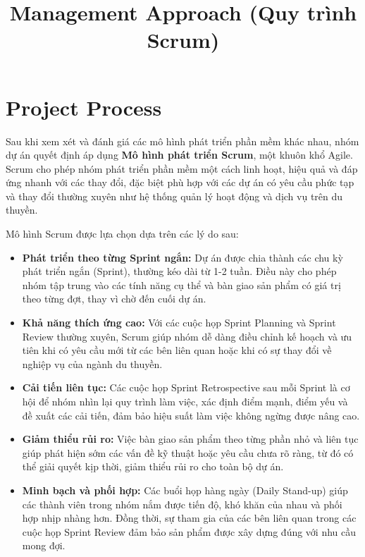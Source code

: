 \documentclass[a4paper,12pt]{article}
\title{\textbf{Management Approach (Quy trình Scrum)}}
\author{}
\date{}
\begin{document}
	
	\maketitle
	
	\section{Project Process}
	
	Sau khi xem xét và đánh giá các mô hình phát triển phần mềm khác nhau, nhóm dự án quyết định áp dụng \textbf{Mô hình phát triển Scrum}, một khuôn khổ Agile. Scrum cho phép nhóm phát triển phần mềm một cách linh hoạt, hiệu quả và đáp ứng nhanh với các thay đổi, đặc biệt phù hợp với các dự án có yêu cầu phức tạp và thay đổi thường xuyên như hệ thống quản lý hoạt động và dịch vụ trên du thuyền.
	
	Mô hình Scrum được lựa chọn dựa trên các lý do sau:
	
	\begin{itemize}
		\item \textbf{Phát triển theo từng Sprint ngắn:} Dự án được chia thành các chu kỳ phát triển ngắn (Sprint), thường kéo dài từ 1-2 tuần. Điều này cho phép nhóm tập trung vào các tính năng cụ thể và bàn giao sản phẩm có giá trị theo từng đợt, thay vì chờ đến cuối dự án.
		
		\item \textbf{Khả năng thích ứng cao:} Với các cuộc họp Sprint Planning và Sprint Review thường xuyên, Scrum giúp nhóm dễ dàng điều chỉnh kế hoạch và ưu tiên khi có yêu cầu mới từ các bên liên quan hoặc khi có sự thay đổi về nghiệp vụ của ngành du thuyền.
		
		\item \textbf{Cải tiến liên tục:} Các cuộc họp Sprint Retrospective sau mỗi Sprint là cơ hội để nhóm nhìn lại quy trình làm việc, xác định điểm mạnh, điểm yếu và đề xuất các cải tiến, đảm bảo hiệu suất làm việc không ngừng được nâng cao.
		
		\item \textbf{Giảm thiểu rủi ro:} Việc bàn giao sản phẩm theo từng phần nhỏ và liên tục giúp phát hiện sớm các vấn đề kỹ thuật hoặc yêu cầu chưa rõ ràng, từ đó có thể giải quyết kịp thời, giảm thiểu rủi ro cho toàn bộ dự án.
		
		\item \textbf{Minh bạch và phối hợp:} Các buổi họp hàng ngày (Daily Stand-up) giúp các thành viên trong nhóm nắm được tiến độ, khó khăn của nhau và phối hợp nhịp nhàng hơn. Đồng thời, sự tham gia của các bên liên quan trong các cuộc họp Sprint Review đảm bảo sản phẩm được xây dựng đúng với nhu cầu mong đợi.
	\end{itemize}
	
\end{document}
